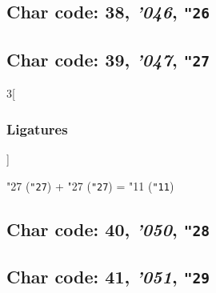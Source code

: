 \documentclass{article}
\newlength{\maxcharwidth}
\begin{document}
\subsection{Char code: 38, {\it'046}, {\tt"26}}
\label{char_38}


\subsection{Char code: 39, {\it'047}, {\tt"27}}
\label{char_39}


\begin{multicols}{3}[\subsubsection{Ligatures}]

{\testfont\char"27\noboundary} ({\tt"27}) + {\testfont\char"27\noboundary} ({\tt"27}) = {\testfont\char"11\noboundary} ({\tt"11}) 

\end{multicols}

\subsection{Char code: 40, {\it'050}, {\tt"28}}
\label{char_40}


\subsection{Char code: 41, {\it'051}, {\tt"29}}
\label{char_41}
\end{document}
